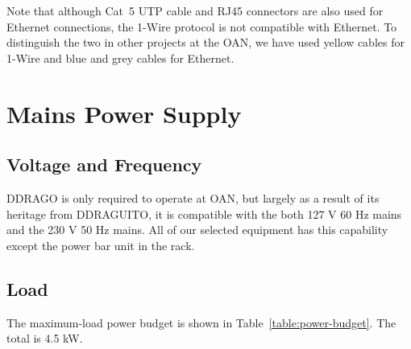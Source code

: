 \documentclass{article}
\begin{document}
Note that although Cat~5 UTP cable and RJ45 connectors are also used for Ethernet connections, the 1-Wire protocol is not compatible with Ethernet. To distinguish the two in other projects at the OAN, we have used yellow cables for 1-Wire and blue and grey cables for Ethernet.



\clearpage
\section{Mains Power Supply}

\subsection{Voltage and Frequency}

DDRAGO is only required to operate at OAN, but largely as a result of its heritage from DDRAGUITO, it is compatible with the both 127 V 60 Hz mains and the 230 V 50 Hz mains. All of our selected equipment has this capability except the power bar unit in the rack.



\subsection{Load}

The maximum-load power budget is shown in Table~\ref{table:power-budget}. The total is 4.5 kW.
\end{document}
